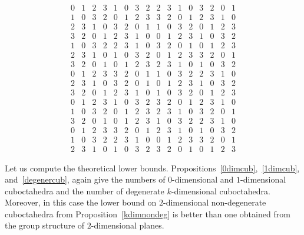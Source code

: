 \documentclass[a4paper]{article}
\begin{document}
 $$
 \begin{array}{cccc|cccc|cccc|cccc}
 0 &  1 &  2 &  3 &  1 &  0 &  3 &  2 &  2 &  3 &  1 &  0 & 3 &  2 &  0 &  1 \\   
 1 &  0 &  3 &  2  & 0 &  1 &  2 &  3 &   3 &  2 &  0 &  1 &   2 &  3 &  1 &  0 \\
 2 &  3 &  1 &  0 &   3 &  2 &  0 &  1 &   1 &  0 &  3 &  2 &   0 &  1 &  2 &  3 \\
 3 &  2 &  0 &  1 &   2 &  3 &  1 &  0 &   0 &  1 &  2 &  3 &   1 &  0 &  3 &  2 \\  
 \hline
  1 &  0 &  3 &  2 &   2 &  3 &  1 &  0 &   3 &  2 &  0 &  1 &   0 &  1 &  2 &  3 \\  
 2 &  3 &  1 &  0 &   1 &  0 &  3 &  2 &   0 &  1 &  2 &  3 &   3 &  2 &  0 &  1 \\  
 3 &  2 &  0 &  1 &   0 &  1 &  2 &  3 &   2 &  3 &  1 &  0 &   1 &  0 &  3 &  2 \\ 
 0 &  1 &  2 &  3 &   3 &  2 &  0 &  1 &   1 & 0 &  3 &  2 &   2 &  3 &  1 &  0 \\  
 \hline
  2 &  3 &  1 &  0 &   3 &  2 &  0 &  1 &   0 &  1 &  2 &  3 &   1 &  0 &  3 &  2 \\   
  3 &  2 &  0 &  1 &   2 &  3 &  1 &  0 &   1 &  0 &  3 &  2 &   0 &  1 &  2 &  3 \\  
  0 &  1 &  2 &  3 &   1 &  0 &  3 &  2 &   3 &  2 &  0 &  1 &   2 &  3 &  1 &  0 \\   
  1 &  0 &  3 &  2 &   0 &  1 &  2 &  3 &   2 &  3 &  1 &  0 &   3 &  2 &  0 &  1 \\  
  \hline
  3 &  2 &  0 &  1 &   0 &  1 &  2 &  3 &   1 &  0 &  3 &  2 &   2 &  3 &  1 &  0 \\   
  0 &  1 &  2 &  3 &   3 &  2 &  0 &  1 &   2 &  3 &  1 &  0 &   1 &  0 &  3 &  2 \\  
  1 &  0 &  3 &  2 &   2 &  3 &  1 &  0 &   0 &  1 &  2 &  3 &   3 &  2 &  0 &  1 \\  
  2 &  3 &  1 &  0 &   1 &  0 &  3 &  2 &   3 &  2 &  0 &  1 &   0 &  1 &  2 &  3
 \end{array}
 $$
 


Let us compute the theoretical lower bounds. Propositions~\ref{0dimcub},~\ref{1dimcub}, and~\ref{degenercub},  again give  the numbers of  $0$-dimensional and $1$-dimensional cuboctahedra  and  the number of degenerate $k$-dimensional cuboctahedra. 
Moreover, in this case the lower bound  on  $2$-dimensional non-degenerate cuboctahedra from Proposition~\ref{kdimnondeg} is better than one obtained from the group structure of $2$-dimensional planes. 
\end{document}
